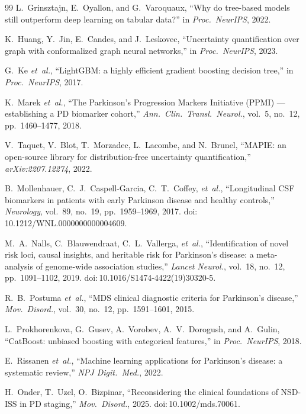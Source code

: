 \begin{thebibliography}{99}
L.~Grinsztajn, E.~Oyallon, and G.~Varoquaux, ``Why do tree-based models still outperform deep learning on tabular data?'' in \textit{Proc.\ NeurIPS}, 2022.

K.~Huang, Y.~Jin, E.~Candes, and J.~Leskovec, ``Uncertainty quantification over graph with conformalized graph neural networks,'' in \textit{Proc.\ NeurIPS}, 2023.

G.~Ke \textit{et~al.}, ``LightGBM: a highly efficient gradient boosting decision tree,'' in \textit{Proc.\ NeurIPS}, 2017.

K.~Marek \textit{et~al.}, ``The Parkinson's Progression Markers Initiative (PPMI) --- establishing a PD biomarker cohort,'' \textit{Ann.\ Clin.\ Transl.\ Neurol.}, vol.~5, no.~12, pp.~1460--1477, 2018.

V.~Taquet, V.~Blot, T.~Morzadec, L.~Lacombe, and N.~Brunel, ``MAPIE: an open-source library for distribution-free uncertainty quantification,'' \textit{arXiv:2207.12274}, 2022.

B.~Mollenhauer, C.~J.~Caspell-Garcia, C.~T.~Coffey, \textit{et~al.}, ``Longitudinal CSF biomarkers in patients with early Parkinson disease and healthy controls,'' \textit{Neurology}, vol.~89, no.~19, pp.~1959--1969, 2017. doi:\,10.1212/WNL.0000000000004609.

M.~A.~Nalls, C.~Blauwendraat, C.~L.~Vallerga, \textit{et~al.}, ``Identification of novel risk loci, causal insights, and heritable risk for Parkinson's disease: a meta-analysis of genome-wide association studies,'' \textit{Lancet Neurol.}, vol.~18, no.~12, pp.~1091--1102, 2019. doi:\,10.1016/S1474-4422(19)30320-5.

R.~B.~Postuma \textit{et~al.}, ``MDS clinical diagnostic criteria for Parkinson's disease,'' \textit{Mov.\ Disord.}, vol.~30, no.~12, pp.~1591--1601, 2015.

L.~Prokhorenkova, G.~Gusev, A.~Vorobev, A.~V.~Dorogush, and A.~Gulin, ``CatBoost: unbiased boosting with categorical features,'' in \textit{Proc.\ NeurIPS}, 2018.

E.~Rissanen \textit{et~al.}, ``Machine learning applications for Parkinson's disease: a systematic review,'' \textit{NPJ Digit.\ Med.}, 2022.

H.~Onder, T.~Uzel, O.~Bizpinar, ``Reconsidering the clinical foundations of NSD-ISS in PD staging,'' \textit{Mov.\ Disord.}, 2025. doi:\,10.1002/mds.70061.


\end{thebibliography}
